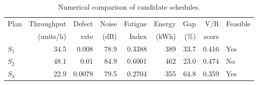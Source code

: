\begin{table}[htbp]
\centering
\caption{Numerical comparison of candidate schedules.}
\label{tab:numerical-sim}
\small
\begin{tabular}{@{}lrrrrrrrl@{}}
\toprule
Plan & Throughput & Defect & Noise & Fatigue & Energy & Gap & V/R & Feasible \\
     & (units/h)  & rate   & (dB)  & Index   & (kWh)  & (\%) & score &         \\
\midrule
$S_{1}$ & 34.5 & 0.008 & 78.9 & 0.3388 & 389 & 33.7 & 0.416 & Yes \\
$S_{2}$ & 48.1 & 0.01 & 84.9 & 0.6001 & 462 & 23.0 & 0.474 & No \\
$S_{3}$ & 22.9 & 0.0078 & 79.5 & 0.2704 & 355 & 64.8 & 0.359 & Yes \\
\bottomrule
\end{tabular}
\end{table}
